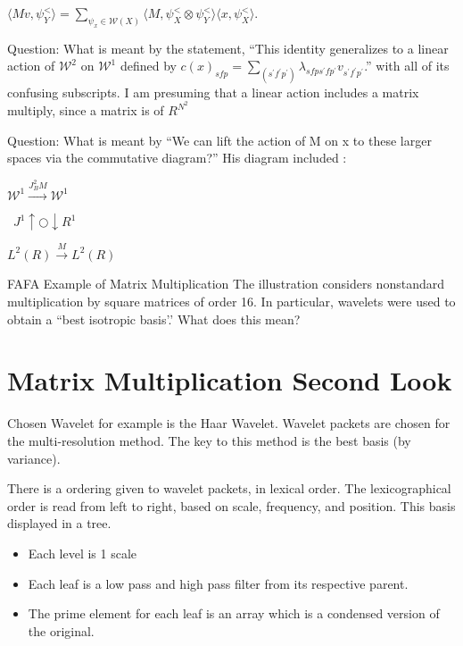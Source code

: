 \documentclass[11pt]{book}
\begin{document}
$\langle Mv , \psi^<_Y\rangle = \sum\limits_{\psi_x \in \mathcal{W}(X)} \langle M, \psi^<_X \otimes \psi^<_Y\rangle \langle x, \psi^<_X\rangle $.


Question:  What is meant by the statement, ``This identity generalizes to a linear action of $\mathcal{W}^2$ on $\mathcal{W}^1$ defined by $c(x)_{sfp} = \sum\limits_{(s^\prime f^\prime p^\prime)} \lambda_{sfps^\prime fp^\prime } v_{s^\prime f^\prime p^\prime}$.'' with all of its confusing subscripts.  I am presuming that a linear action includes a matrix multiply, since a matrix is of $R^{N^2}$ 

Question: What is meant by ``We can lift the action of M on x to these larger spaces via the commutative diagram?''  His diagram included :

\begin{center}
\begin{minipage}{5cm}


\mbox {$\mathcal{W}^1 \stackrel {J^2_B M}{\to} \mathcal{W}^1$}

\mbox { $J^1 \uparrow \bigcirc  \downarrow R^1$ }

\mbox {$L^2(R)  \stackrel{M}{\to} L^2(R)$ }


\end{minipage}

\end{center}


FAFA Example of Matrix Multiplication 
The illustration considers nonstandard multiplication by square matrices of order 16.  In particular, wavelets were used to obtain a ``best isotropic basis'.'   What does this mean?  

\chapter {Matrix Multiplication Second Look}
Chosen Wavelet for example is the Haar Wavelet.  Wavelet packets are chosen for the multi-resolution method.  The key to this method is the best basis (by variance).  

There is a ordering given to wavelet packets, in lexical order.  The lexicographical order is read from left to right, based on scale, frequency, and position.  This basis displayed in a tree.  
\begin{itemize}
\item Each level is 1 scale
\item Each leaf is a low pass and high pass filter from its respective parent.  
\item The prime element for each leaf is an array which is a condensed version of the original.  
\end{itemize}
\end{document}
